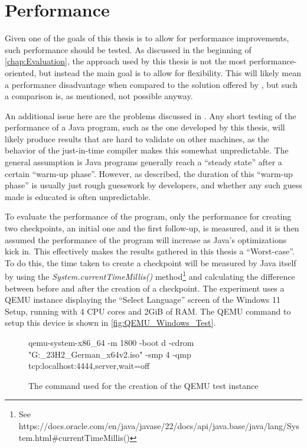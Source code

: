 \section{Performance}\label{sec:eval_performance}
Given one of the goals of this thesis is to allow for performance improvements,
such performance should be tested.
As discussed in the beginning of \autoref{chap:Evaluation},
the approach used by this thesis is not the most performance-oriented,
but instead the main goal is to allow for flexibility.
This will likely mean a performance disadvantage when compared to the solution offered by \citeauthor{kitcheckpoints},
but such a comparison is, as mentioned, not possible anyway.

An additional issue here are the problems \citeauthor{Java_Benchmarking} discussed in \cite{Java_Benchmarking}.
Any short testing of the performance of a Java program, such as the one developed by this thesis,
will likely produce results that are hard to validate on other machines,
as the behavior of the just-in-time compiler makes this somewhat unpredictable.
The general assumption is Java programs generally reach a \enquote{steady state} after a certain \enquote{warm-up phase}.
However, as \citeauthor{Java_Benchmarking} described, the duration of this \enquote{warm-up phase}
is usually just rough guesswork by developers,
and whether any such guess made is educated is often unpredictable\cite{Java_Benchmarking}.

To evaluate the performance of the program,
only the performance for creating two checkpoints,
an initial one and the first follow-up,
is measured, and it is then assumed the performance of the program will increase as Java's optimizations kick in.
This effectively makes the results gathered in this thesis a \enquote{Worst-case}.
To do this, the time taken to create a checkpoint will be measured by Java itself
by using the \emph{System.currentTimeMillis()} method\footnote{See https://docs.oracle.com/en/java/javase/22/docs/api/java.base/java/lang/System.html#currentTimeMillis()}
and calculating the difference between before and after the creation of a checkpoint.
The experiment uses a QEMU instance displaying the \enquote{Select Language} screen of the Windows 11 Setup,
running with 4 CPU cores and 2GiB of RAM.
The QEMU command to setup this device is shown in \autoref{fig:QEMU_Windows_Test}.

\begin{figure}[h]
    \begin{ffcode}
        qemu-system-x86_64 -m 1800 -boot d -cdrom "G:_23H2_German_x64v2.iso" -smp 4 -qmp tcp:localhost:4444,server,wait=off
    \end{ffcode}
    \label{fig:QEMU_Windows_Test}
    \caption{The command used for the creation of the QEMU test instance}
\end{figure}

